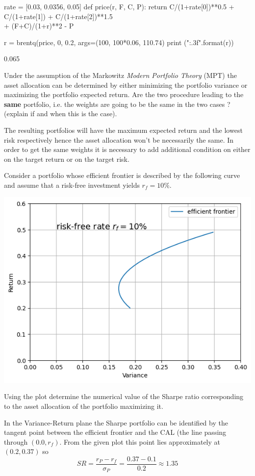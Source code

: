 \documentclass[12pt,a4paper]{exam}
\begin{document}
\begin{questions}
\begin{solution}
\begin{ipython}
rate = [0.03, 0.0356, 0.05]
def price(r, F, C, P):
    return C/(1+rate[0])**0.5 + C/(1+rate[1]) + C/(1+rate[2])**1.5 \\
        + (F+C)/(1+r)**2 - P

r = brentq(price, 0, 0.2, args=(100, 100*0.06, 110.74)
print ("{:.3f}".format(r))
\end{ipython}
\begin{ioutput}
0.065
\end{ioutput}
\end{solution}

\question
Under the assumption of the Markowitz \emph{Modern Portfolio Theory} (MPT) the asset allocation can be determined by either minimizing the portfolio variance or maximizing the portfolio expected return. Are the two procedure leading to the \textbf{same} portfolio, i.e. the weights are going to be the same in the two cases ? (explain if and when this is the case).
\fillwithlines{3cm}
\begin{solution}
The resulting portfolios will have the maximum expected return and the lowest risk respectively hence the asset allocation won't be necessarily the same. In order to get the same weights it is necessary to add additional condition on either on the target return or on the target risk.
\end{solution}

\question
Consider a portfolio whose efficient frontier is described by the following curve and assume that a risk-free investment yields $r_f = 10\%$.
\begin{center}
  \includegraphics[width=0.7\linewidth]{efficient_frontier}
\end{center}
Using the plot determine the numerical value of the Sharpe ratio corresponding to the asset allocation of the portfolio maximizing it.
\fillwithlines{3cm}
\begin{solution}
In the Variance-Return plane the Sharpe portfolio can be identified by the tangent point between the efficient frontier and the CAL (the line passing through $(0.0, r_f)$. From the given plot this point lies approximately at $(0.2, 0.37)$ so
\begin{equation*}
  SR = \frac{r_P - r_f}{\sigma_P} = \frac{0.37-0.1}{0.2} \approx 1.35
\end{equation*}
\end{solution}


\end{questions}
\end{document}
